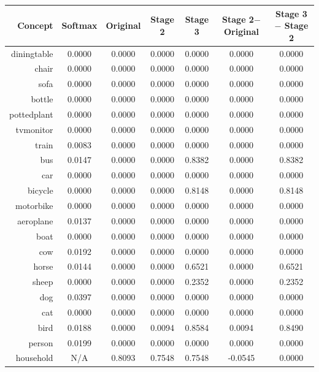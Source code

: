 \documentclass[11pt,a4paper]{article}
\begin{document}
\begin{table}[htbp]
\centering
\begin{tabular}{r|c|c|c|c|c|c}
Concept & Softmax & Original & Stage 2 & Stage 3 & \makecell{Stage 2$-$\\Original} & \makecell{Stage 3$-$\\Stage 2}\\\hline
diningtable   & 0.0000 & 0.0000 & 0.0000 & 0.0000 & 0.0000 & 0.0000\\
chair         & 0.0000 & 0.0000 & 0.0000 & 0.0000 & 0.0000 & 0.0000\\
sofa          & 0.0000 & 0.0000 & 0.0000 & 0.0000 & 0.0000 & 0.0000\\
bottle        & 0.0000 & 0.0000 & 0.0000 & 0.0000 & 0.0000 & 0.0000\\
pottedplant   & 0.0000 & 0.0000 & 0.0000 & 0.0000 & 0.0000 & 0.0000\\
tvmonitor     & 0.0000 & 0.0000 & 0.0000 & 0.0000 & 0.0000 & 0.0000\\
train         & 0.0083 & 0.0000 & 0.0000 & 0.0000 & 0.0000 & 0.0000\\
bus           & 0.0147 & 0.0000 & 0.0000 & 0.8382 & 0.0000 & 0.8382\\
car           & 0.0000 & 0.0000 & 0.0000 & 0.0000 & 0.0000 & 0.0000\\
bicycle       & 0.0000 & 0.0000 & 0.0000 & 0.8148 & 0.0000 & 0.8148\\
motorbike     & 0.0000 & 0.0000 & 0.0000 & 0.0000 & 0.0000 & 0.0000\\
aeroplane     & 0.0137 & 0.0000 & 0.0000 & 0.0000 & 0.0000 & 0.0000\\
boat          & 0.0000 & 0.0000 & 0.0000 & 0.0000 & 0.0000 & 0.0000\\
cow           & 0.0192 & 0.0000 & 0.0000 & 0.0000 & 0.0000 & 0.0000\\
horse         & 0.0144 & 0.0000 & 0.0000 & 0.6521 & 0.0000 & 0.6521\\
sheep         & 0.0000 & 0.0000 & 0.0000 & 0.2352 & 0.0000 & 0.2352\\
dog           & 0.0397 & 0.0000 & 0.0000 & 0.0000 & 0.0000 & 0.0000\\
cat           & 0.0000 & 0.0000 & 0.0000 & 0.0000 & 0.0000 & 0.0000\\
bird          & 0.0188 & 0.0000 & 0.0094 & 0.8584 & 0.0094 & 0.8490\\
person        & 0.0199 & 0.0000 & 0.0000 & 0.0000 & 0.0000 & 0.0000\\\hline
household     & N/A    & 0.8093 & 0.7548 & 0.7548 & -0.0545 & 0.0000\\

\end{tabular}
\end{table}
\end{document}

